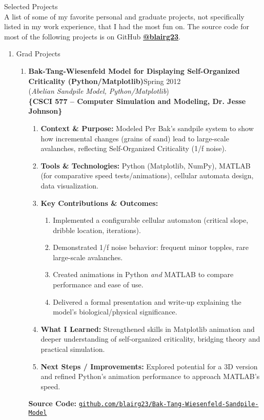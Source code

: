 \documentclass[oneside]{article}%
\begin{document}
\newpage
\noindent
\huge{Selected Projects}\\
\small
A list of some of my favorite personal and graduate projects, not specifically listed in my work experience, that I had the most fun on. The source code for most of the following projects is on GitHub \textbf{\href{https://github.com/blairg23}{@blairg23}}.
\begin{enumerate}[]
	\item \large{Grad Projects}
		\small
		\begin{enumerate}[]
			\normalsize
			\item \textbf{Bak-Tang-Wiesenfeld Model for Displaying Self-Organized Criticality (Python/Matplotlib)}\hfill Spring 2012\\
			\small
			(\textit{Abelian Sandpile Model, Python/Matplotlib})\\
			\textbf{\{CSCI 577 -- Computer Simulation and Modeling, Dr. Jesse Johnson\}}
				\begin{enumerate}[-]
					\item \textbf{Context \& Purpose:} Modeled Per Bak’s sandpile system to show how incremental changes (grains of sand) lead to large-scale avalanches, reflecting Self-Organized Criticality (1/f noise).
					\item \textbf{Tools \& Technologies:} Python (Matplotlib, NumPy), MATLAB (for comparative speed tests/animations), cellular automata design, data visualization.
					\item \textbf{Key Contributions \& Outcomes:}
						\begin{enumerate}[--] %
							\item Implemented a configurable cellular automaton (critical slope, dribble location, iterations).
							\item Demonstrated 1/f noise behavior: frequent minor topples, rare large-scale avalanches.
							\item Created animations in Python \textit{and} MATLAB to compare performance and ease of use.
							\item Delivered a formal presentation and write-up explaining the model’s biological/physical significance.
						\end{enumerate}
					\item \textbf{What I Learned:} Strengthened skills in Matplotlib animation and deeper understanding of self-organized criticality, bridging theory and practical simulation.
					\item \textbf{Next Steps / Improvements:} Explored potential for a 3D version and refined Python’s animation performance to approach MATLAB’s speed.
				\end{enumerate}
				\vspace{3pt} %
				\textbf{Source Code:} \href{https://github.com/blairg23/Bak-Tang-Wiesenfeld-Sandpile-Model}{\texttt{github.com/blairg23/Bak-Tang-Wiesenfeld-Sandpile-Model}}\\


\end{enumerate}
\end{enumerate}
\end{document}

